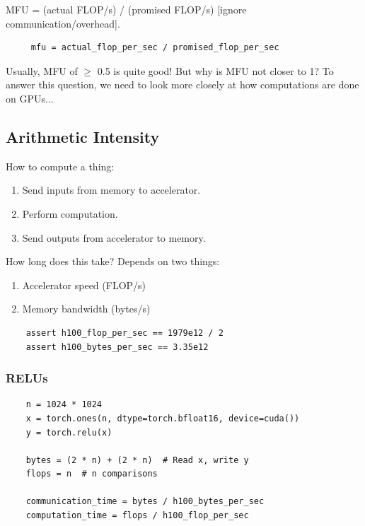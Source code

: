 \documentclass[12pt,twoside]{article}
\begin{document}
\begin{definition}
    MFU = (actual FLOP/s) / (promised FLOP/s) [ignore communication/overhead].
\end{definition}

\begin{verbatim}
     mfu = actual_flop_per_sec / promised_flop_per_sec 
\end{verbatim}

Usually, MFU of \(\geq\) 0.5 is quite good! But why is MFU not closer to 1? To answer this question, we need to look more closely at how computations are done on GPUs...

\subsection*{Arithmetic Intensity}

How to compute a thing:

\begin{enumerate}
    \item Send inputs from memory to accelerator.
    \item Perform computation.
    \item Send outputs from accelerator to memory.
\end{enumerate}

How long does this take? Depends on two things:

\begin{enumerate}
    \item Accelerator speed (FLOP/s)
    \item Memory bandwidth (bytes/s)
\end{enumerate}

\begin{verbatim}
    assert h100_flop_per_sec == 1979e12 / 2
    assert h100_bytes_per_sec == 3.35e12
\end{verbatim}

\subsubsection*{RELUs}

\begin{verbatim}
    n = 1024 * 1024
    x = torch.ones(n, dtype=torch.bfloat16, device=cuda())
    y = torch.relu(x)
    
    bytes = (2 * n) + (2 * n)  # Read x, write y
    flops = n  # n comparisons
    
    communication_time = bytes / h100_bytes_per_sec  
    computation_time = flops / h100_flop_per_sec  
\end{verbatim}
\end{document}
